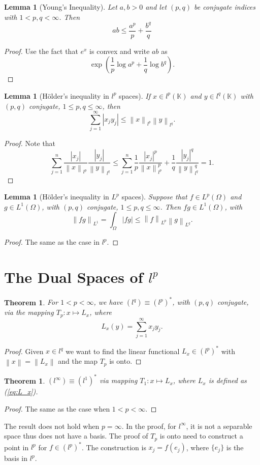 \documentclass[12pt,a4paper]{report}
\numberwithin{equation}{section}
\theoremstyle{mystyle}
\newtheorem{theorem}[definition]{Theorem}
\newtheorem{lemma}[definition]{Lemma}
\newcommand{\K}{\mathbb{K}}
\newcommand{\norm}[1]{\left\lVert #1 \right\rVert}
\begin{document}
	\begin{lemma}[Young's Inequality]
		Let $a,b>0$ and let $(p,q)$ be conjugate indices with $1<p,q<\infty$. Then
		$$
		ab\leq \frac{a^p}{p}+\frac{b^q}{q}
		$$
	\end{lemma}
	\begin{proof}
		Use the fact that $e^x$ is convex and write $ab$ as
		$$
		\exp\left(\frac{1}{p}\log a^p + \frac{1}{q} \log b^q\right).
		$$
	\end{proof}

	\begin{lemma}[H\"{o}lder's inequality in $l^p$ spaces]
		If $x\in l^p(\K)$ and $y\in l^q(\K)$ with $(p,q)$ conjugate, $1\leq p,q\leq \infty$, then
		$$
		\sum_{j=1}^\infty |x_j y_j|\leq \norm{x}_{l^p}\norm{y}_{l^q}.
		$$
	\end{lemma}
	\begin{proof}
		Note that
		$$
		\sum_{j=1}^n \frac{|x_j|}{\norm{x}_{l^p}}\frac{|y_j|}{\norm{y}_{l^q}}\leq \sum_{j=1}^n \frac{1}{p}\frac{|x_j|^p}{\norm{x}^p_{l^p}}+\frac{1}{q}\frac{|y_j|^q}{\norm{y}^q_{l^q}}=1.
		$$
	\end{proof}
	\begin{lemma}[H\"{o}lder's inequality in $L^p$ spaces]
		Suppose that $f\in L^p(\Omega)$ and $g\in L^1(\Omega)$, with $(p,q)$ conjugate, $1\leq p,q\leq \infty$. Then $fg\in L^1(\Omega)$, with
		$$
		\norm{fg}_{L^1}=\int_{\Omega} |fg|\leq \norm{f}_{L^p}\norm{g}_{L^q}.
		$$
	\end{lemma}
	\begin{proof}
		The same as the case in $l^p$.
	\end{proof}
	
	\section{The Dual Spaces of $l^p$}
	\begin{theorem}
		For $1<p<\infty$, we have $(l^q)\equiv (l^p)^*$, with $(p,q)$ conjugate, via the mapping $T_p:x\mapsto L_x$, where
		\begin{equation}
			L_x(y)=\sum_{j=1}^\infty x_j y_j.\label{eq:L_x}
		\end{equation}
	\end{theorem}
	\begin{proof}
		Given $x\in l^q$ we want to find the linear functional $L_x\in (l^p)^*$ with $\norm{x}=\norm{L_x}$ and the map $T_p$ is onto. 
	\end{proof}
	
	\begin{theorem}
		$(l^\infty)\equiv (l^1)^*$ via mapping $T_1:x\mapsto L_x$, where $L_x$ is defined as (\ref{eq:L_x}).
	\end{theorem}
	\begin{proof}
		The same as the case when $1<p<\infty$.
	\end{proof}
	The result does not hold when $p=\infty$. In the proof, for $l^\infty$, it is not a separable space thus does not have a basis. The proof of $T_p$ is onto need to construct a point in $l^p$ for $f\in (l^p)^*$. The construction is $x_j=f(e_j)$, where $\{e_j\}$ is the basis in $l^p$. 
	
\end{document}
